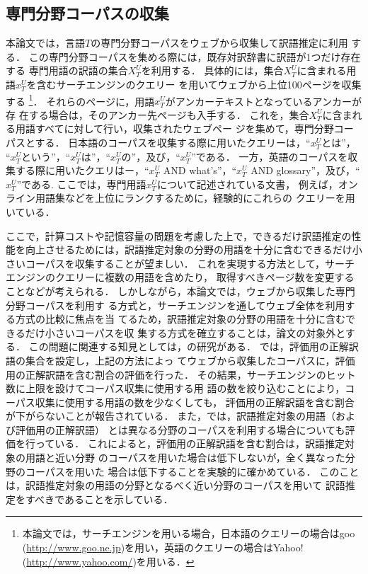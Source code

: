 \documentclass[japanese]{jnlp_1.3a}
\begin{document}
\subsection{専門分野コーパスの収集}
\label{sec:corpus}

本論文では，言語$T$の専門分野コーパスをウェブから収集して訳語推定に利用
する．
この専門分野コーパスを集める際には，既存対訳辞書に訳語が1つだけ存在する
専門用語の訳語の集合$X_T^U$を利用する．
具体的には，集合$X_T^U$に含まれる用語$x_T^U$を含むサーチエンジンのクエリー
を用いてウェブから上位100ページを収集する
\footnote
{本論文では，サーチエンジンを用いる場合，日本語のクエリーの場合はgoo
(\url{http://www.goo.ne.jp})を用い，英語のクエリーの場合はYahoo!
(\url{http://www.yahoo.com/})を用いる．}．
それらのページに，用語$x_T^U$がアンカーテキストとなっているアンカーが存
在する場合は，そのアンカー先ページも入手する．
これを，集合$X_T^U$に含まれる用語すべてに対して行い，収集されたウェブペー
ジを集めて，専門分野コーパスとする．
日本語のコーパスを収集する際に用いたクエリーは，“$x_T^U$とは”，
“$x_T^U$という”，“$x_T^U$は”，“$x_T^U$の”，及び，``$x_T^U$''である．
一方，英語のコーパスを収集する際に用いたクエリはー，``$x_T^U$ AND
what's''，``$x_T^U$ AND glossary''，及び，``$x_T^U$''である.
ここでは，専門用語$x_T^U$について記述されている文書，
例えば，オンライン用語集などを上位にランクするために，経験的にこれらの
クエリーを用いている．

ここで，計算コストや記憶容量の問題を考慮した上で，できるだけ訳語推定の性
能を向上させるためには，訳語推定対象の分野の用語を十分に含むできるだけ小
さいコーパスを収集することが望ましい．
これを実現する方法として，サーチエンジンのクエリーに複数の用語を含めたり，
取得すべきページ数を変更することなどが考えられる．
しかしながら，本論文では，ウェブから収集した専門分野コーパスを利用す
る方式と，サーチエンジンを通してウェブ全体を利用する方式の比較に焦点を当
てるため，訳語推定対象の分野の用語を十分に含むできるだけ小さいコーパスを収
集する方式を確立することは，論文の対象外とする．
この問題に関連する知見としては，\cite{Takagi05aj}の研究がある．
\cite{Takagi05aj}では，評価用の正解訳語の集合を設定し，上記の方法によっ
てウェブから収集したコーパスに，評価用の正解訳語を含む割合の評価を行った．
その結果，サーチエンジンのヒット数に上限を設けてコーパス収集に使用する用
語の数を絞り込むことにより，コーパス収集に使用する用語の数を少なくしても，
評価用の正解訳語を含む割合が下がらないことが報告されている．
また，\cite{Takagi05aj}では，訳語推定対象の用語（および評価用の正解訳語）
とは異なる分野のコーパスを利用する場合についても評価を行っている．
これによると，評価用の正解訳語を含む割合は，訳語推定対象の用語と近い分野
のコーパスを用いた場合は低下しないが，全く異なった分野のコーパスを用いた
場合は低下することを実験的に確かめている．
このことは，訳語推定対象の用語の分野となるべく近い分野のコーパスを用いて
訳語推定をすべきであることを示している．
\end{document}
